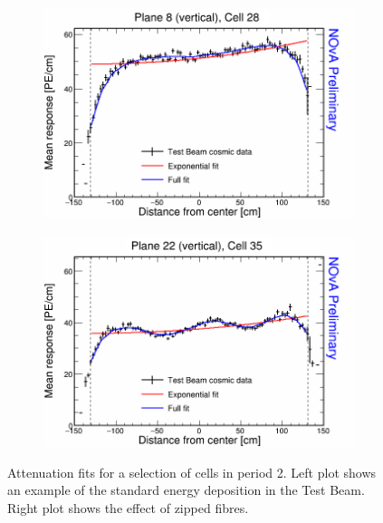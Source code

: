 \begin{figure}[h]
  \begin{subfigure}{0.495\textwidth}
    \includegraphics[width=\linewidth]{Plots/RelativeCalibrationResults/p2_008_028.png}
  \end{subfigure}
  \begin{subfigure}{0.495\textwidth}
    \includegraphics[width=\linewidth]{Plots/RelativeCalibrationResults/p2_022_035.png}
  \end{subfigure}
  \caption[Attenuation fits for standard cells in period 2 data]{Attenuation fits for a selection of cells in period 2. Left plot shows an example of the standard energy deposition in the Test Beam. Right plot shows the effect of zipped fibres.}
  \label{fig:AttenfitResultsPerio2_ZippedFibers}
\end{figure}

